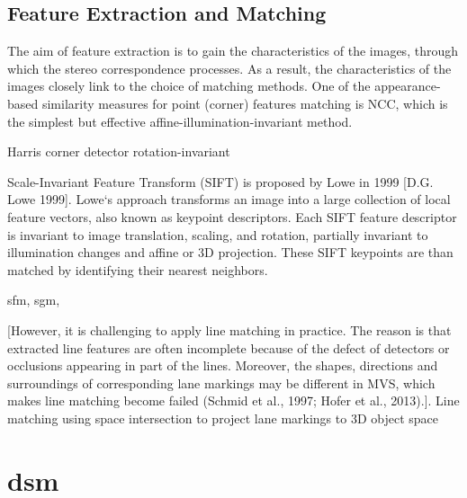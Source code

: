 \subsection{Feature Extraction and Matching}
The aim of feature extraction is to gain the characteristics of the images, through which the stereo correspondence processes. As a result, the characteristics of the images closely link to the choice of matching methods. %
One of the appearance-based similarity measures for point (corner) features matching is NCC, which is the simplest but effective affine-illumination-invariant method. 

Harris corner detector rotation-invariant

Scale-Invariant Feature Transform (SIFT) is proposed by Lowe in 1999 [D.G. Lowe 1999]. Lowe‘s approach transforms an image into a large collection of local feature vectors, also known as keypoint descriptors. Each SIFT feature descriptor is invariant to image translation, scaling, and rotation, partially invariant to illumination changes and affine or 3D projection. These SIFT keypoints are than matched by identifying their nearest neighbors.


sfm, sgm, 


[However, it is challenging to apply line matching in practice. The reason is that extracted line features are often incomplete because of the defect of detectors or occlusions appearing in part of the lines. Moreover, the shapes, directions and surroundings of corresponding lane markings may be different in MVS, which makes line matching become failed (Schmid et al., 1997; Hofer et al., 2013).]. Line matching%
using space intersection to project lane markings to 3D object space%





\section{\gls{dsm}}


